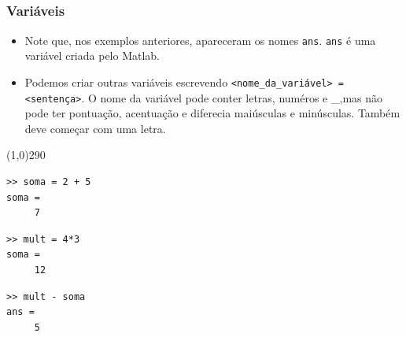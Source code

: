 \documentclass{beamer}
\newcommand{\delim}{\line(1,0){290}}
\begin{document}
\subsection[Elementos B\'asicos]{}

\begin{frame}[fragile]
  \frametitle{Vari\'aveis}

  \begin{itemize}
  \item<1-> Note que, nos exemplos anteriores, apareceram os nomes {\tt ans}. {\tt ans} \'e uma vari\'avel criada pelo Matlab.

  \item<2-> Podemos criar outras vari\'aveis escrevendo {\tt <nome\_da\_vari\'avel> = <senten\c{c}a>}. O nome da vari\'avel pode conter letras, num\'eros e \_,mas n\~ao pode ter pontua\c{c}\~ao, acentua\c{c}\~ao e diferecia mai\'usculas e min\'usculas. Tamb\'em deve come\c{c}ar com uma letra.
  \end{itemize}
  \pause \pause
  \delim
  \begin{center}
  \begin{minipage}{4 cm}
  \begin{verbatim}
>> soma = 2 + 5
soma =
     7
  \end{verbatim}
  \end{minipage}
  \begin{minipage}{4 cm}
  \begin{verbatim}
>> mult = 4*3
soma =
     12
  \end{verbatim}
  \end{minipage}

  \begin{minipage}{4 cm}
  \begin{verbatim}
>> mult - soma
ans =
     5
  \end{verbatim}
  \end{minipage}
  \end{center}

\end{frame}
\end{document}
